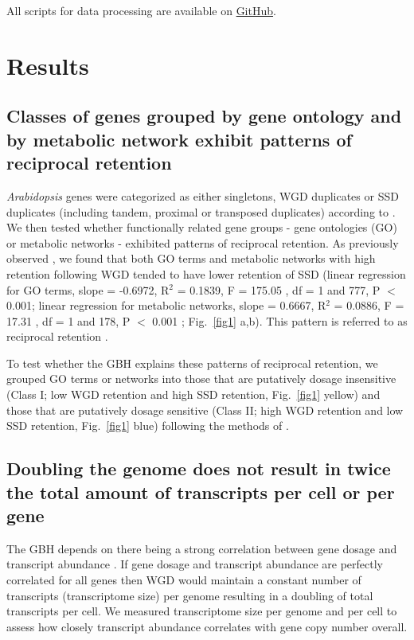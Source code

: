 \documentclass[11pt]{article}
\begin{document}
All scripts for data processing are available on \href{https://github.com/barneypotter24/ploidy-seq}{GitHub}.

\section*{Results}
\subsection*{Classes of genes grouped by gene ontology and by metabolic network exhibit patterns of reciprocal retention}

{\it Arabidopsis} genes were categorized as either singletons, WGD duplicates or SSD duplicates (including tandem, proximal or transposed duplicates) according to \cite{wang2013}. We then tested whether functionally related gene groups - gene ontologies (GO) or metabolic networks \citep{schlapfer2017}- exhibited patterns of reciprocal retention. As previously observed \citep{freeling2009, coate2016, tasdighian2017}, we found that both GO terms and metabolic networks with high retention following WGD tended to have lower retention of SSD (linear regression for GO terms, slope = -0.6972, R$^2$ = 0.1839, F = 175.05 , df = 1 and 777, P $<$ 0.001;  linear  regression  for  metabolic  networks, slope = 0.6667, R$^2$ = 0.0886, F = 17.31 , df = 1 and 178, P $<$ 0.001 ; Fig.~\ref{fig1}  a,b). This pattern is referred to as reciprocal retention \citep{cannon2004, freeling2009}.

To test whether the GBH explains these patterns of reciprocal retention, we grouped GO terms or networks into those that are putatively dosage insensitive (Class I; low WGD retention and high SSD retention, Fig.~\ref{fig1} yellow) and those that are putatively dosage sensitive (Class II; high WGD retention and low SSD retention, Fig.~\ref{fig1} blue) following the methods of \cite{coate2016}.

\subsection*{Doubling the genome does not result in twice the total amount of transcripts per cell or per gene}

The GBH depends on there being a strong correlation between gene dosage and transcript abundance \citep{coate2016}. If gene dosage and transcript abundance are perfectly correlated for all genes then WGD would maintain a constant number of transcripts (transcriptome size) per genome resulting in a doubling of total transcripts per cell. We measured transcriptome size per genome and per cell to assess how closely transcript abundance correlates with gene copy number overall.
\end{document}
